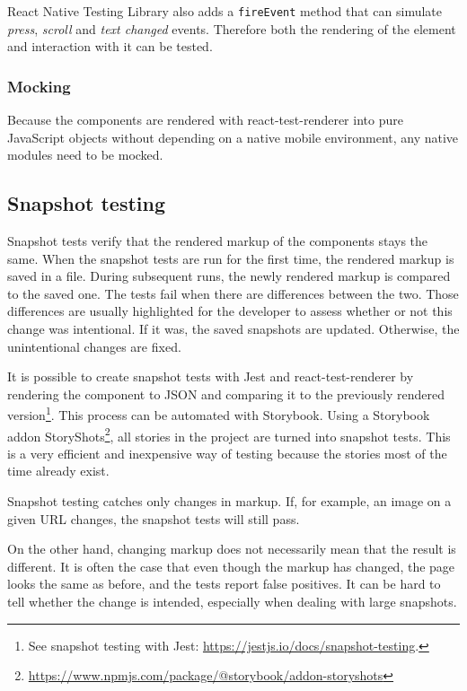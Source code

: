 \documentclass[
  digital, %
  table,   %
  oneside, %
  lof,     %
  lot,     %
]{fithesis3}
\begin{document}
React Native Testing Library also adds a \texttt{fireEvent} method that can simulate \textit{press}, \textit{scroll} and \textit{text changed} events. Therefore both the rendering of the element and interaction with it can be tested.

\subsubsection{Mocking}
Because the components are rendered with react-test-renderer into pure JavaScript objects without depending on a native mobile environment, any native modules need to be mocked.

\subsection{Snapshot testing}
\label{sec:snapshot_testing}
Snapshot tests verify that the rendered markup of the components stays the same. When the snapshot tests are run for the first time, the rendered markup is saved in a file.
During subsequent runs, the newly rendered markup is compared to the saved one. The tests fail when there are differences between the two. Those differences are usually highlighted for the developer to assess whether or not this change was intentional. If it was, the saved snapshots are updated. Otherwise, the unintentional changes are fixed.

It is possible to create snapshot tests with Jest and react-test-renderer by rendering the component to JSON and comparing it to the previously rendered version\footnote{See snapshot testing with Jest: \url{https://jestjs.io/docs/snapshot-testing}.}. This process can be automated with Storybook. Using a Storybook addon StoryShots\footnote{\url{https://www.npmjs.com/package/@storybook/addon-storyshots}}, all stories in the project are turned into snapshot tests. This is a very efficient and inexpensive way of testing because the stories most of the time already exist.

Snapshot testing catches only changes in markup. If, for example, an image on a given URL changes, the snapshot tests will still pass. 

On the other hand, changing markup does not necessarily mean that the result is different. It is often the case that even though the markup has changed, the page looks the same as before, and the tests report false positives. It can be hard to tell whether the change is intended, especially when dealing with large snapshots.
\end{document}
